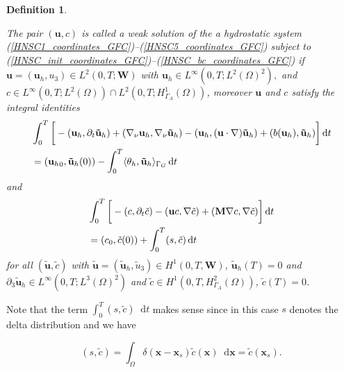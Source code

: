 \documentclass[12pt]{report}
\numberwithin{theorem}{chapter}
\numberwithin{corollary}{chapter}
\numberwithin{lemma}{chapter}
\numberwithin{remark}{chapter}
\newtheorem{definition}{Definition}
\numberwithin{definition}{chapter}
\numberwithin{prop}{chapter}
\newcommand*\diff{\mathop{}\!\mathrm{d}}
\begin{document}
\begin{definition} \label{definitionhydrostaticWF_gfc}

The pair $(\mathbf{u}, c)$ is called a weak solution of the a hydrostatic system (\ref{HNSC1_coordinates_GFC})--(\ref{HNSC5_coordinates_GFC}) subject to (\ref{HNSC_init_coordinates_GFC})--(\ref{HNSC_bc_coordinates_GFC}) if $\mathbf{u} = (\mathbf{u}_h, u_3) \in L^2 (0, T; \mathbf{W})$ with $\mathbf{u}_h \in L^\infty (0,T; L^2(\Omega)^2),$ and $c \in L^\infty(0,T; L^2(\Omega)) \cap L^2(0,T; H^1_{\Gamma_A}(\Omega))$, moreover $\mathbf{u}$ and $c$ satisfy the integral identities
%
\begin{equation}
\begin{split}
& \int_0^T \bigg[ -(\mathbf{u}_h, \partial_t \mathbf{\tilde{u}}_h) + (\nabla_\nu \mathbf{u}_h, \nabla_\nu \mathbf{\tilde{u}}_h) - (\mathbf{u}_h, (\mathbf{u} \cdot \nabla) \mathbf{\tilde{u}}_h) + (b(\mathbf{u}_h), \mathbf{\tilde{u}}_h) \bigg ] \diff t \\
& = ({\mathbf{u}_h}_0, \mathbf{\tilde{u}}_h(0)) - \int_0^T \langle \theta_h, \mathbf{\tilde{u}}_h \rangle_{\Gamma_G} \diff t \raisetag{15pt}\label{hydrostaticWF_U}
\end{split}
\end{equation}
%
and
%
\begin{equation}
\begin{split}
& \int_0^T \bigg[ -(c, \partial_t \tilde{c}) -(\mathbf{u}c, \nabla \tilde{c}) +  (\mathbf{M} \nabla c, \nabla \tilde{c}) \bigg ] \diff t \\
& = (c_0, \tilde{c}(0)) + \int_0^T (s,\tilde{c}) \diff t \raisetag{20pt} \label{hydrostaticWF_C}
\end{split}
\end{equation}
%
for all $(\mathbf{\tilde{u}}, \tilde{c})$ with $\mathbf{\tilde{u}} = (\mathbf{\tilde{u}}_h, \tilde{u}_3) \in H^1 (0,T, \mathbf{W})$, $\mathbf{\tilde{u}}_h (T) = 0$ and $\partial_3 \mathbf{\tilde{u}}_h \in L^\infty (0, T; L^3 (\Omega)^2)$ and  $\tilde{c} \in H^1 (0,T, H^2_{\Gamma_A} (\Omega))$, $\tilde{c} (T) = 0$.
  
\end{definition}

Note that the term $\int_0^T (s,\tilde{c}) \diff t$ makes sense since in this case $s$ denotes the delta distribution and we have 
  
\[ (s,\tilde{c}) = \int_\Omega \delta(\mathbf{x} - \mathbf{x}_s) \tilde{c}(\mathbf{x}) \diff \mathbf{x} = \tilde{c}(\mathbf{x}_s).\]
  
\end{document}
